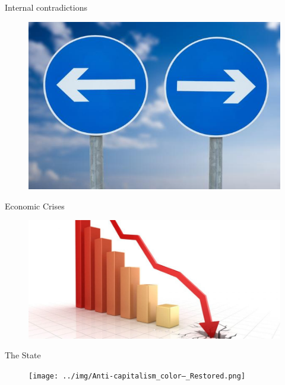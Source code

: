 \documentclass{beamer}
\begin{document}
\begin{frame}{Internal contradictions} 

	\begin{figure}[htpb]
		\centering
		\includegraphics[width=0.8\linewidth]{../img/contradiction.jpg}
	\end{figure}

\end{frame}

\begin{frame}{Economic Crises}

	\begin{figure}[htpb]
		\centering
		\includegraphics[width=0.8\linewidth]{../img/crash2.jpeg}
	\end{figure}

\end{frame}

\begin{frame}{The State}

	\begin{figure}[htpb]
		\centering
		\texttt{[image: ../img/Anti-capitalism\_color—\_Restored.png]}
	\end{figure}

\end{frame}
\end{document}

